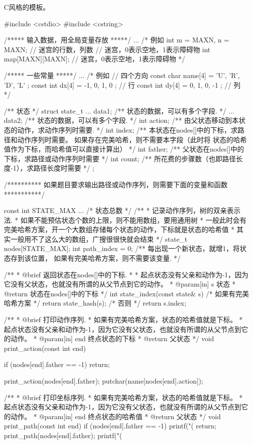 C风格的模板。
\begin{Codex}[label=bfs_template2.cpp]
#include <cstdio>
#include <cstring>

/***** 输入数据，用全局变量存放 *****/
...
/*
例如
int m = MAXN, n = MAXN;  // 迷宫的行数，列数
// 迷宫，0表示空地，1表示障碍物
int map[MAXN][MAXN];  // 迷宫，0表示空地，1表示障碍物
 */

/***** 一些常量 *****/
...
/* 例如
// 四个方向
const char name[4] = { 'U', 'R', 'D', 'L' };
const int dx[4] = { -1, 0, 1, 0 }; // 行
const int dy[4] = { 0, 1, 0, -1 }; // 列
*/

/** 状态 */
struct state_t {
    ... data1;  /** 状态的数据，可以有多个字段. */
    ... data2;  /** 状态的数据，可以有多个字段. */
    int action; /** 由父状态移动到本状态的动作，求动作序列时需要. */
    int index;  /** 本状态在nodes[]中的下标，求路径和动作序列时需要。
                    如果存在完美哈希，则不需要本字段（此时将
                   状态的哈希值作为下标，而哈希值可以直接计算出） */
    int father; /** 父状态在nodes[]中的下标，求路径或动作序列时需要 */
    int count;  /** 所花费的步骤数（也即路径长度-1），求路径长度时需要 */
};

/********** 如果题目要求输出路径或动作序列，则需要下面的变量和函数 ***********/

const int STATE_MAX ...  /* 状态总数 */
/**
 * 记录动作序列，树的双亲表示法.
 * 如果不能预估状态个数的上限，则不能用数组，要用通用树
 * 一般此时会有完美哈希方案，开一个大数组存储每个状态的动作，下标就是状态的哈希值
 * 其实一般用不了这么大的数组，广搜很很快就会结束
 */
state_t nodes[STATE_MAX];
int path_index = 0;  /** 每出现一个新状态，就增1，将状态存到该位置，
                         如果有完美哈希方案，则不需要该变量. */

/**
 * @brief 返回状态在nodes[]中的下标.
 * 
 * 起点状态没有父亲和动作为-1，因为它没有父状态，也就没有所谓的从父节点到它的动作。
 * @param[in] s 状态
 * @return 状态在nodes[]中的下标
 */
int state_index(const state& s) {
    /* 如果有完美哈希方案 */
    return state_hash(s);
    /* 否则 */
    return s.index;
}

/**
 * @brief 打印动作序列.
 * 如果有完美哈希方案，状态的哈希值就是下标。
 * 起点状态没有父亲和动作为-1，因为它没有父状态，也就没有所谓的从父节点到它的动作。
 * @param[in] end 终点状态的下标
 * @return 父状态
 */
void print_action(const int end) {
    if (nodes[end].father == -1) return;

    print_action(nodes[end].father);
    putchar(name[nodes[end].action]);
}

/**
 * @brief 打印坐标序列.
 * 如果有完美哈希方案，状态的哈希值就是下标。
 * 起点状态没有父亲和动作为-1，因为它没有父状态，也就没有所谓的从父节点到它的动作。
 * @param[in] end 终点状态的哈希值
 * @return 父状态
 */
void print_path(const int end) {
    if (nodes[end].father == -1) {
        printf("(%
        return;
    }
    print_path(nodes[end].father);
    printf("(%
}


\end{Codex}
